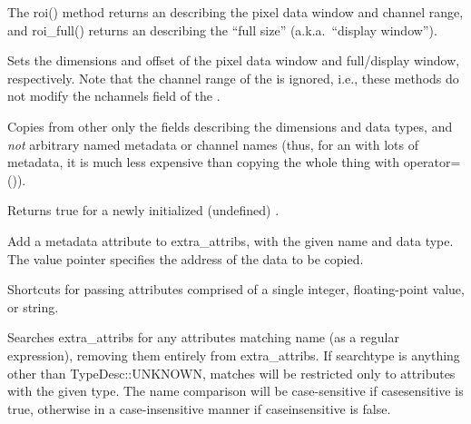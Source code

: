 \NEW %
The {\cf roi()} method returns an \ROI describing the pixel data window and
channel range, and {\cf roi_full()} returns an \ROI describing the ``full
size'' (a.k.a.\ ``display window'').
\apiend

\NEW %
Sets the dimensions and offset of the pixel data window and full/display
window, respectively. Note that the channel range of the \ROI is ignored,
i.e., these methods do not modify the {\cf nchannels} field of the \ImageSpec.
\apiend

\NEW %
Copies from {\cf other} only the fields describing the dimensions and
data types, and \emph{not} arbitrary named metadata or channel names (thus,
for an \ImageSpec with lots of metadata, it is much less expensive than
copying the whole thing with {\cf operator=()}).
\apiend

\NEW %
Returns {\cf true} for a newly initialized (undefined) \ImageSpec.
\apiend



Add a metadata attribute to {\cf extra_attribs}, with the given name and
data type.  The {\cf value} pointer specifies
the address of the data to be copied.
\apiend

Shortcuts for passing attributes comprised of a single integer,
floating-point value, or string.
\apiend


Searches {\cf extra_attribs} for any attributes matching {\cf name} (as
a regular expression), removing them entirely from {\cf extra_attribs}.
If {\cf searchtype} is anything other than {\cf TypeDesc::UNKNOWN},
matches will be restricted only to attributes with the given type.
The name comparison will be case-sensitive if {\cf casesensitive} is true, otherwise
in a case-insensitive manner if {\cf caseinsensitive} is false.
\apiend

